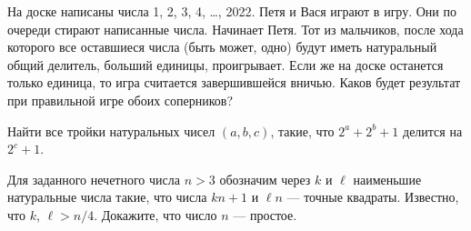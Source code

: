 На доске написаны числа 1, 2, 3, 4, …, 2022. Петя и Вася играют в игру. Они по очереди стирают написанные числа. Начинает Петя. Тот из мальчиков, после хода которого все оставшиеся числа (быть может, одно) будут иметь натуральный общий делитель, больший единицы, проигрывает. Если же на доске останется только единица, то игра считается завершившейся вничью. Каков будет результат при правильной игре обоих соперников?

Найти все тройки натуральных чисел $(a,b,c)$, такие, что $2^a+2^b+1$ делится на $2^c+1$.

Для заданного нечетного числа $n>3$ обозначим через $k$ и $\ell$ наименьшие натуральные числа такие, что числа $kn+1$ и $\ell n$ — точные квадраты. Известно, что $k$, $\ell > n/4$. Докажите, что число $n$ --- простое.